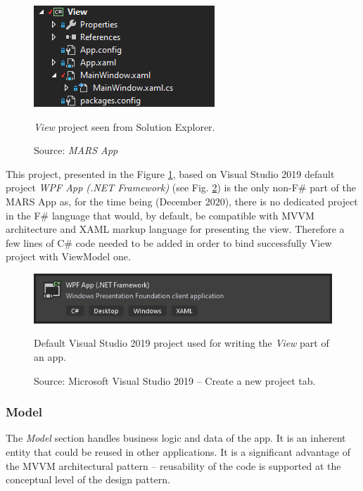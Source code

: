         \begin{figure}[H]
            \centering
            \includegraphics{img/view.png}
            \caption{\textit{View} project seen from Solution Explorer.}
            \caption*{Source: \textit{MARS App}}
            \label{fig:view}
        \end{figure}
        
        This project, presented in the Figure \ref{fig:view}, based on Visual Studio 2019 default project \textit{WPF App (.NET Framework)} (see Fig. \ref{fig:view_wpfApp}) is the only non-F\# part of the MARS App as, for the time being (December 2020), there is no dedicated project in the F\# language that would, by default, be compatible with MVVM architecture and XAML markup language for presenting the view. Therefore a few lines of C\# code needed to be added in order to bind successfully View project with ViewModel one.
        
        \begin{figure}[H]
            \centering
            \includegraphics{img/view_wpfApp.png}
            \caption{Default Visual Studio 2019 project used for writing the \textit{View} part of an app.}
            \caption*{Source: Microsoft Visual Studio 2019 -- Create a new project tab.}
            \label{fig:view_wpfApp}
        \end{figure}

    \subsubsection{Model}
        The \textit{Model} section handles business logic and data of the app. It is an inherent entity that could be reused in other applications. It is a significant advantage of the MVVM architectural pattern -- reusability of the code is supported at the conceptual level of the design pattern.
        
